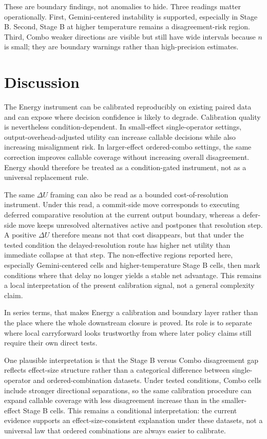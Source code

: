 \documentclass[11pt,a4paper]{article}
\begin{document}
These are boundary findings, not anomalies to hide. Three readings matter operationally. First, Gemini-centered instability is supported, especially in Stage B. Second, Stage B at higher temperature remains a disagreement-risk region. Third, Combo weaker directions are visible but still have wide intervals because $n$ is small; they are boundary warnings rather than high-precision estimates.

\section{Discussion}
\label{sec:discussion}

The Energy instrument can be calibrated reproducibly on existing paired data and can expose where decision confidence is likely to degrade. Calibration quality is nevertheless condition-dependent. In small-effect single-operator settings, output-overhead-adjusted utility can increase callable decisions while also increasing misalignment risk. In larger-effect ordered-combo settings, the same correction improves callable coverage without increasing overall disagreement. Energy should therefore be treated as a condition-gated instrument, not as a universal replacement rule.

The same $\Delta U$ framing can also be read as a bounded cost-of-resolution instrument. Under this read, a commit-side move corresponds to executing deferred comparative resolution at the current output boundary, whereas a defer-side move keeps unresolved alternatives active and postpones that resolution step. A positive $\Delta U$ therefore means not that cost disappears, but that under the tested condition the delayed-resolution route has higher net utility than immediate collapse at that step. The non-effective regions reported here, especially Gemini-centered cells and higher-temperature Stage B cells, then mark conditions where that delay no longer yields a stable net advantage. This remains a local interpretation of the present calibration signal, not a general complexity claim.

In series terms, that makes Energy a calibration and boundary layer rather than the
place where the whole downstream closure is proved. Its role is to separate where
local carryforward looks trustworthy from where later policy claims still require
their own direct tests.

One plausible interpretation is that the Stage B versus Combo disagreement gap reflects effect-size structure rather than a categorical difference between single-operator and ordered-combination datasets. Under tested conditions, Combo cells include stronger directional separations, so the same calibration procedure can expand callable coverage with less disagreement increase than in the smaller-effect Stage B cells. This remains a conditional interpretation: the current evidence supports an effect-size-consistent explanation under these datasets, not a universal law that ordered combinations are always easier to calibrate.
\end{document}
